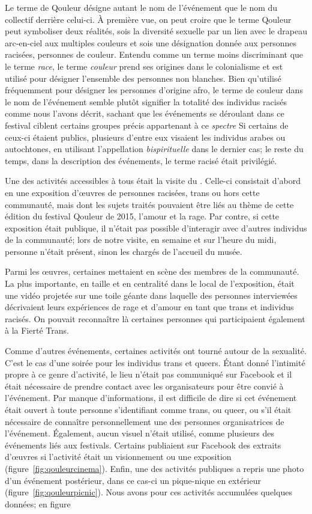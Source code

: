 Le terme de Qouleur désigne autant le nom de l'événement que le nom du collectif derrière celui-ci.
À première vue, on peut croire que le terme Qouleur peut symboliser deux réalités, sois la diversité sexuelle par un lien avec le drapeau arc-en-ciel aux multiples couleurs et sois une désignation donnée aux personnes racisées, personnes de couleur.
Entendu comme un terme moins discriminant que le terme \emph{race}, le terme \emph{couleur} prend ses origines dans le colonialisme et est utilisé pour désigner l'ensemble des personnes non blanches.
Bien qu'utilisé fréquemment pour désigner les personnes d'origine afro, le terme de couleur dans le nom de l'événement semble plutôt signifier la totalité des individus racisés comme nous l’avons décrit, sachant que les événements se déroulant dans ce festival ciblent certains groupes précis appartenant à ce \emph{spectre}
Si certains de ceux-ci étaient publics, plusieurs d'entre eux visaient les individus arabes ou autochtones, en utilisant l'appellation \emph{bispirituelle} dans le dernier cas; le reste du temps, dans la description des événements, le terme racisé était privilégié.

Une des activités accessibles à tous était la visite du \mai{}.
Celle-ci consistait d'abord en une exposition d'œuvres de personnes racisées, trans ou hors cette communauté, mais dont les sujets traités pouvaient être liés au thème de cette édition du festival Qouleur de 2015, l'amour et la rage.
Par contre, si cette exposition était publique, il n'était pas possible d'interagir avec d'autres individus de la communauté; lors de notre visite, en semaine et sur l'heure du midi, personne n'était présent, sinon les chargés de l'accueil du musée.

Parmi les œuvres, certaines mettaient en scène des membres de la communauté.
La plus importante, en taille et en centralité dans le local de l'exposition, était une vidéo projetée sur une toile géante dans laquelle des personnes interviewées décrivaient leurs expériences de rage et d'amour en tant que trans et individus racisés.
On pouvait reconnaître là certaines personnes qui participaient également à la Fierté Trans.

Comme d'autres événements, certaines activités ont tourné autour de la sexualité.
C'est le cas d'une soirée \bdsm{} pour les individus trans et queers.
Étant donné l'intimité propre à ce genre d'activité, le lieu n'était pas communiqué sur Facebook et il était nécessaire de prendre contact avec les organisateurs pour être convié à l'événement.
Par manque d'informations, il est difficile de dire si cet événement était ouvert à toute personne s'identifiant comme trans, ou queer, ou s’il était nécessaire de connaître personnellement une des personnes organisatrices de l'événement.
Également, aucun visuel n'était utilisé, comme plusieurs des événements liés aux festivals.
Certains publiaient sur Facebook des extraits d'œuvres si l'activité était un visionnement ou une exposition (figure~\ref{fig:qouleurcinema}).
Enfin, une des activités publiques a repris une photo d'un événement postérieur, dans ce cas-ci un pique-nique en extérieur (figure~\ref{fig:qouleurpicnic}).
Nous avons pour ces activités accumulées quelques données; en figure


